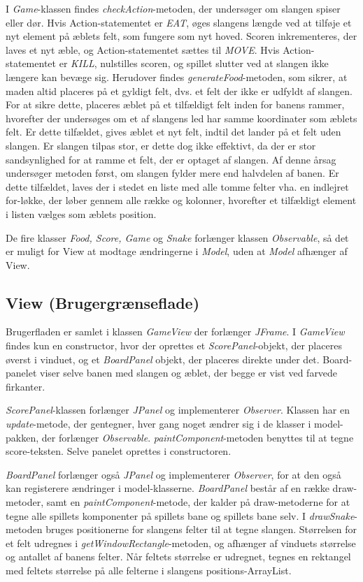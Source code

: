 I \textit{Game}-klassen findes \textit{checkAction}-metoden, der undersøger om slangen spiser eller dør. Hvis Action-statementet er \textit{EAT}, øges slangens længde ved at tilføje et nyt element på æblets felt, som fungere som nyt hoved. Scoren inkrementeres, der laves et nyt æble, og Action-statementet sættes til \textit{MOVE}.
Hvis Action-statementet er \textit{KILL}, nulstilles scoren, og spillet slutter ved at slangen ikke længere kan bevæge sig.
Herudover findes \textit{generateFood}-metoden, som sikrer, at maden altid placeres på et gyldigt felt, dvs. et felt der ikke er udfyldt af slangen. For at sikre dette, placeres æblet på et tilfældigt felt inden for banens rammer, hvorefter der undersøges om et af slangens led har samme koordinater som æblets felt. Er dette tilfældet, gives æblet et nyt felt, indtil det lander på et felt uden slangen. Er slangen tilpas stor, er dette dog ikke effektivt, da der er stor sandsynlighed for at ramme et felt, der er optaget af slangen. Af denne årsag undersøger metoden først, om slangen fylder mere end halvdelen af banen. Er dette tilfældet, laves der i stedet en liste med alle tomme felter vha. en indlejret for-løkke, der løber gennem alle række og kolonner, hvorefter et tilfældigt element i listen vælges som æblets position.

De fire klasser \textit{Food, Score, Game} og \textit{Snake} forlænger klassen \textit{Observable}, så det er muligt for View at modtage ændringerne i \textit{Model}, uden at \textit{Model} afhænger af View.


\subsection{View (Brugergrænseflade)}
Brugerfladen er samlet i klassen \textit{GameView} der forlænger \textit{JFrame}. I \textit{GameView} findes kun en constructor, hvor der oprettes et \textit{ScorePanel}-objekt, der placeres øverst i vinduet, og et \textit{BoardPanel} objekt, der placeres direkte under det. Board-panelet viser selve banen med slangen og æblet, der begge er vist ved farvede firkanter. 

\textit{ScorePanel}-klassen forlænger \textit{JPanel} og implementerer \textit{Observer}. Klassen har en \textit{update}-metode, der gentegner, hver gang noget ændrer sig i de klasser i model-pakken, der forlænger \textit{Observable}. 
\textit{paintComponent}-metoden benyttes til at tegne score-teksten. Selve panelet oprettes i constructoren.

\textit{BoardPanel} forlænger også \textit{JPanel} og implementerer \textit{Observer}, for at den også kan registerere ændringer i model-klasserne. \textit{BoardPanel} består af en række draw-metoder, samt en \textit{paintComponent}-metode, der kalder på draw-metoderne for at tegne alle spillets komponenter på spillets bane og spillets bane selv.
I \textit{drawSnake}-metoden bruges positionerne for slangens felter til at tegne slangen. Størrelsen for et felt udregnes i \textit{getWindowRectangle}-metoden, og afhænger af vinduets størrelse og antallet af banens felter. Når feltets størrelse er udregnet, tegnes en rektangel med feltets størrelse på alle felterne i slangens positions-ArrayList.

